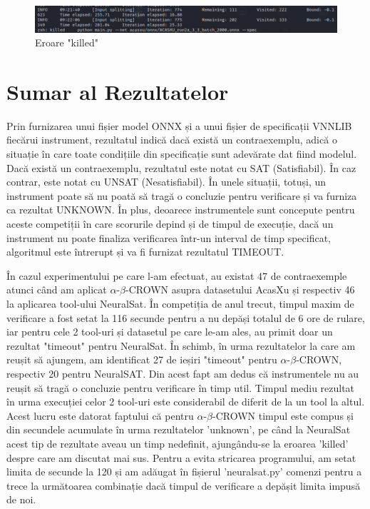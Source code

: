 \documentclass[12pt,a4paper]{article}
\theoremstyle{definition}
\theoremstyle{remark}
\begin{document}
\begin{figure}[h!]
  \centering
    \includegraphics[width=1\textwidth]{killed.png}
    \caption{Eroare "killed"}
\end{figure}
\section{Sumar al Rezultatelor}
Prin furnizarea unui fișier model ONNX și a unui fișier de specificații VNNLIB fiecărui instrument, rezultatul indică dacă există un contraexemplu, adică o situație în care toate condițiile din specificație sunt adevărate dat fiind modelul. Dacă există un contraexemplu, rezultatul este notat cu SAT (Satisfiabil). În caz contrar, este notat cu UNSAT (Nesatisfiabil). În unele situații, totuși, un instrument poate să nu poată să tragă o concluzie pentru verificare și va furniza ca rezultat UNKNOWN. În plus, deoarece instrumentele sunt concepute pentru aceste competiții în care scorurile depind și de timpul de execuție, dacă un instrument nu poate finaliza verificarea într-un interval de timp specificat, algoritmul este întrerupt și va fi furnizat rezultatul TIMEOUT.\par
În cazul experimentului pe care l-am efectuat, au existat 47 de contraexemple atunci când am aplicat $\alpha$-$\beta$-CROWN asupra datasetului AcasXu și respectiv 46 la aplicarea tool-ului NeuralSat. În competiția de anul trecut, timpul maxim de verificare a fost setat la 116 secunde pentru a nu depăși totalul de 6 ore de rulare, iar pentru cele 2 tool-uri și datasetul pe care le-am ales, au primit doar un rezultat "timeout" pentru NeuralSat. În schimb, în urma rezultatelor la care am reușit să ajungem, am identificat 27 de ieșiri "timeout" pentru $\alpha$-$\beta$-CROWN, respectiv 20 pentru NeuralSAT. Din acest fapt am dedus că instrumentele nu au reușit să tragă o concluzie pentru verificare în timp util. Timpul mediu rezultat în urma execuției celor 2 tool-uri este considerabil de diferit de la un tool la altul. Acest lucru este datorat faptului că pentru $\alpha$-$\beta$-CROWN timpul este compus și din secundele acumulate în urma rezultatelor 'unknown', pe când la NeuralSat acest tip de rezultate aveau un timp ne­definit, ajungându-se la eroarea 'killed' despre care am discutat mai sus. Pentru a evita stricarea programului, am setat limita de secunde la 120 și am adăugat în fișierul 'neuralsat.py' comenzi pentru a trece la următoarea combinație dacă timpul de verificare a depășit limita impusă de noi.\par
\end{document}
